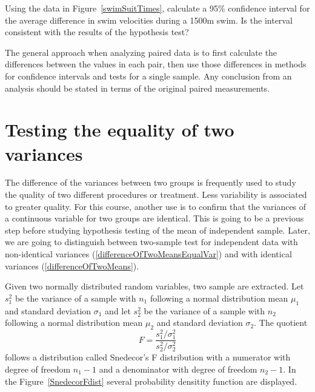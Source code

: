 
\begin{exercisewrap}
\begin{nexercise} 
Using the data in Figure~\ref{swimSuitTimes}, calculate a 95\% confidence interval for the average difference in swim velocities during a 1500m swim. Is the interval consistent with the results of the hypothesis test?\footnotemark{}
\end{nexercise}
\end{exercisewrap}

The general approach when analyzing paired data is to first calculate the differences between the values in each pair, then use those differences in methods for confidence intervals and tests for a single sample.  Any conclusion from an analysis should be stated in terms of the original paired measurements.



\section{Testing the equality of two variances}
\label{TwoVariancesSection}
The difference of the variances between two groups is frequently used to study
the quality of two different procedures or treatment. Less variability
is associated to greater quality. For this course, another use is to confirm that the variances of a continuous variable for two groups are identical. This is going to be a previous step before studying hypothesis testing of the mean of independent sample. Later, we are going to distinguish between two-sample test for independent data with non-identical variances (\ref{differenceOfTwoMeansEqualVar}) and with identical variances (\ref{differenceOfTwoMeans}).



Given two normally distributed  random variables, two sample are extracted.  Let  $s_1^2$ be the variance of a sample with $n_1$ following a normal distribution mean $\mu_1$ and standard deviation $\sigma_1$ and let $s_2^2$  be the variance of a sample with $n_2$ following a normal distribution mean $\mu_2$ and standard deviation $\sigma_2$.  The quotient 
$$F=\frac{s_1^2/\sigma_1^2}{s_2^2/\sigma_2^2}$$ 
follows a distribution called Snedecor's F distribution with a numerator with degree of freedom $n_1-1$ and a denominator with degree of freedom $n_2-1$. In the Figure~\ref{SnedecorFdist} several probability densitity function are displayed.

